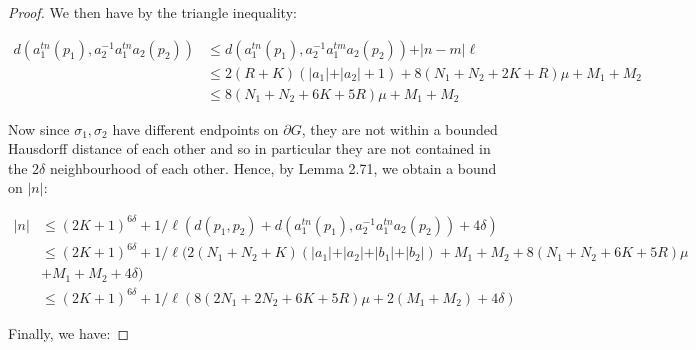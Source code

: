 \documentclass[12pt]{article}
\newcommand{\vs}{\vskip10pt}
\begin{document}
\begin{proof}
		\vs 
		
		We then have by the triangle inequality:  
		
		\begin{align*}
		d(a_1^{tn}(p_1), a_2^{-1} a_1^{tn} a_2 (p_2)) &\leq d(a_1^{tn}(p_1), a_2^{-1} a_1^{tm} a_2 (p_2)) + \vert n - m \vert \ell \\
		&\leq 2(R + K) (\vert a_1 \vert + \vert a_2 \vert + 1) + 8(N_1 + N_2 + 2K + R)\mu + M_1 + M_2  \\
		&\leq 8 (N_1 + N_2 + 6K + 5R) \mu + M_1 + M_2
		\end{align*}
		
		
		\vs 
		
		Now since $\sigma_1, \sigma_2$ have different endpoints on $\partial G$, they are not within a bounded Hausdorff distance of each other and so in particular they are not contained in the $2 \delta$ neighbourhood of each other. Hence, by Lemma 2.71, we obtain a bound on $\vert n \vert$: 
		
		\begin{align*}
		\vert n \vert &\leq (2K + 1)^{6 \delta} + 1/\ell (d(p_1, p_2) + d(a_1^{tn}(p_1), a_2^{-1} a_1^{tn}a_2(p_2)) + 4 \delta) \\
		&\leq (2K + 1)^{6 \delta} + 1/\ell (2(N_1 + N_2 + K) (\vert a_1 \vert + \vert a_2 \vert + \vert b_1 \vert + \vert b_2 \vert) + M_1 + M_2 + 8 (N_1 + N_2 + 6K + 5R) \mu \\
		&+ M_1 + M_2 + 4 \delta) \\
		&\leq (2K + 1)^{6 \delta} + 1/\ell (8(2N_1 + 2N_2 + 6K + 5R)\mu + 2(M_1 + M_2) + 4 \delta)
		\end{align*}
		
		
		
		\vs 
		
		Finally, we have: 
		

\end{proof}
\end{document}
